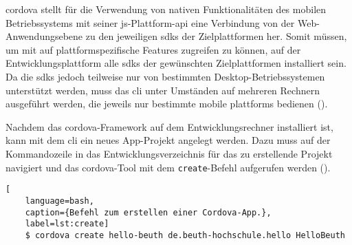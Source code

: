 
\gls{cordova} stellt für die Verwendung von nativen Funktionalitäten des mobilen Betriebssystems mit seiner \gls{js}-Plattform-\gls{api} eine Verbindung von der Web-Anwendungsebene zu den jeweiligen \glspl{sdk} der Zielplattformen her.
Somit müssen, um mit auf plattformspezifische Features zugreifen zu können, auf der Entwicklungsplattform alle \glspl{sdk} der gewünschten Zielplattformen installiert sein.
Da die \glspl{sdk} jedoch teilweise nur von bestimmten Desktop-Betriebssystemen unterstützt werden, muss das \gls{cli} unter Umständen auf mehreren Rechnern ausgeführt werden, die jeweils nur bestimmte mobile \glspl{plattform} bedienen ().


Nachdem das \gls{cordova}-Framework auf dem Entwicklungsrechner installiert ist, kann mit dem \gls{cli} ein neues App-Projekt angelegt werden. 
Dazu muss auf der Kommandozeile in das Entwicklungsverzeichnis für das zu erstellende Projekt navigiert und das \gls{cordova}-Tool mit dem \lstinline|create|-Befehl aufgerufen werden ().

\begin{lstlisting}[
	language=bash,
	caption={Befehl zum erstellen einer Cordova-App.},
	label=lst:create]
	$ cordova create hello-beuth de.beuth-hochschule.hello HelloBeuth
\end{lstlisting}

